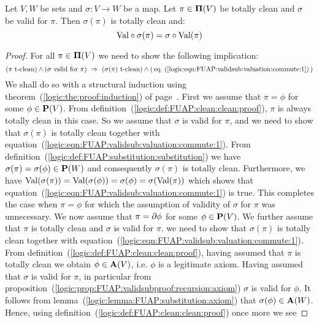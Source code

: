 \begin{prop}\label{logic:prop:FUAP:validsubtotclean:valuation:commute}
Let $V,W$ be sets and $\sigma:V\to W$ be a map. Let $\pi\in\mbox{${\bf\Pi}(V)$}$ be
totally clean and $\sigma$ be valid for $\pi$. Then $\sigma(\pi)$ is
totally clean and:
    \begin{equation}\label{logic:eqn:FUAP:validsub:valuation:commute:1}
    \mbox{\rm Val}\circ\sigma(\pi)=\sigma\circ\mbox{\rm Val}(\pi)
    \end{equation}
\end{prop}
\begin{proof}
For all $\pi\in\mbox{${\bf\Pi}(V)$}$ we need to show the following implication:
    \[
    (\mbox{$\pi$ t-clean})\land(\mbox{$\sigma$ valid for $\pi$})\ \Rightarrow
    \ (\mbox{$\sigma(\pi)$ t-clean})
    \land(\,\mbox{eq.~(\ref{logic:eqn:FUAP:validsub:valuation:commute:1})}\,)
    \]
We shall do so with a structural induction using
theorem~(\ref{logic:the:proof:induction}) of
page~\pageref{logic:the:proof:induction}. First we assume that
$\pi=\phi$ for some $\phi\in\mbox{${\bf P}(V)$}$. From
definition~(\ref{logic:def:FUAP:clean:clean:proof}), $\pi$ is always
totally clean in this case. So we assume that $\sigma$ is valid for
$\pi$, and we need to show that $\sigma(\pi)$ is totally clean
together with
equation~(\ref{logic:eqn:FUAP:validsub:valuation:commute:1}). From
definition~(\ref{logic:def:FUAP:substitution:substitution}) we have
$\sigma(\pi)=\sigma(\phi)\in{\bf P}(W)$ and consequently
$\sigma(\pi)$ is totally clean. Furthermore, we have
$\mbox{\rm Val}(\sigma(\pi))=\mbox{\rm Val}(\sigma(\phi))=\sigma(\phi)=\sigma(\mbox{\rm Val}(\pi))$
which shows that
equation~(\ref{logic:eqn:FUAP:validsub:valuation:commute:1}) is
true. This completes the case when $\pi=\phi$ for which the
assumption of validity of $\sigma$ for $\pi$ was unnecessary. We now
assume that $\pi=\mbox{$\partial$}\phi$ for some $\phi\in\mbox{${\bf P}(V)$}$. We further assume
that $\pi$ is totally clean and $\sigma$ is valid for $\pi$. we need
to show that $\sigma(\pi)$ is totally clean together with
equation~(\ref{logic:eqn:FUAP:validsub:valuation:commute:1}). From
definition~(\ref{logic:def:FUAP:clean:clean:proof}), having assumed
that $\pi$ is totally clean we obtain $\phi\in\mbox{${\bf A}(V)$}$, i.e. $\phi$ is a
legitimate axiom. Having assumed that $\sigma$ is valid for $\pi$,
in particular from
proposition~(\ref{logic:prop:FUAP:validsubproof:recursion:axiom})
$\sigma$ is valid for $\phi$. It follows from
lemma~(\ref{logic:lemma:FUAP:substitution:axiom}) that
$\sigma(\phi)\in{\bf A}(W)$. Hence, using
definition~(\ref{logic:def:FUAP:clean:clean:proof}) once more we see

\end{proof}
